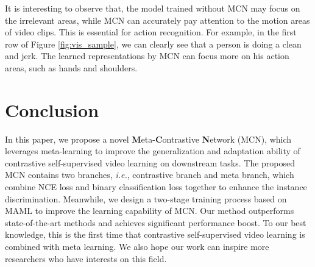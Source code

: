 \documentclass[10pt,twocolumn,letterpaper]{article}
\begin{document}
It is interesting to observe that, the model trained without MCN may focus on the irrelevant areas, while MCN can accurately pay attention to the motion areas of video clips. This is essential for action recognition. For example, in the first row of Figure \ref{fig:vis_sample}, we can clearly see that a person is doing a clean and jerk. The learned representations by MCN can focus more on his action areas, such as hands and shoulders.

\section{Conclusion}
In this paper, we propose a novel \textbf{M}eta-\textbf{C}ontrastive \textbf{N}etwork (MCN), which leverages meta-learning to improve the generalization and adaptation ability of contrastive self-supervised video learning on downstream tasks. The proposed MCN contains two branches, \textit{i.e.}, contrastive branch and meta branch, which combine NCE loss and binary classification loss together to enhance the instance discrimination. Meanwhile, we design a two-stage training process based on MAML to improve the learning capability of MCN. Our method outperforms state-of-the-art methods and achieves significant performance boost. To our best knowledge, this is the first time that contrastive self-supervised video learning is combined with meta learning. We also hope our work can inspire more researchers who have interests on this field. 

{\small


}
\end{document}
